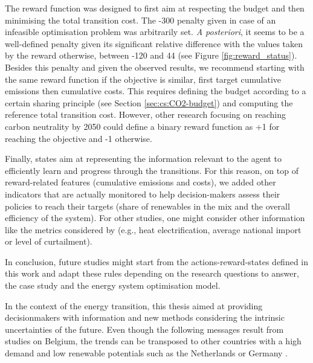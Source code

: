 \documentclass[11pt,twoside,a4paper,english]{article}
\def\eg{e.g., }
\begin{document}
The reward function was designed to first aim at respecting the  budget and then minimising the total transition cost. The -300 penalty given in case of an infeasible optimisation problem was arbitrarily set. \textit{A posteriori}, it seems to be a well-defined penalty given its significant relative difference with the values taken by the reward otherwise, between -120 and 44 (see Figure \ref{fig:reward_status}). Besides this penalty and given the observed results, we recommend starting with the same reward function if the objective is similar, first target cumulative emissions then cumulative costs. This requires defining the  budget according to a certain sharing principle (see Section \ref{sec:cs:CO2-budget}) and computing the reference total transition cost. However, other research focusing on reaching carbon neutrality by 2050 could define a binary reward function as +1 for reaching the objective and -1 otherwise.

Finally, states aim at representing the information relevant to the agent to efficiently learn and progress through the transitions. For this reason, on top of reward-related features (cumulative emissions and costs), we added other indicators that are actually monitored to help decision-makers assess their policies to reach their targets (share of renewables in the mix and the overall efficiency of the system). For other studies, one might consider other information like the metrics considered by \citet{pickering2022diversity} (\eg heat electrification, average national import or level of curtailment).

In conclusion, future studies might start from the actions-reward-states defined in this work and adapt these rules depending on the research questions to answer, the case study and the energy system optimisation model.

In the context of the energy transition, this thesis aimed at providing decisionmakers with information and new methods considering the intrinsic uncertainties of the future. Even though the following messages result from studies on Belgium, the trends can be transposed to other countries with a high demand and low renewable potentials such as the Netherlands or Germany \cite{thiran2024exploring}.



\end{document}
